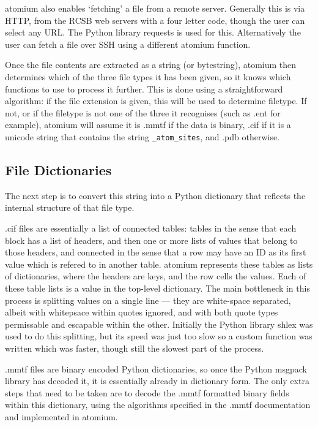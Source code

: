 atomium also enables `fetching' a file from a remote server. Generally this is via HTTP, from the RCSB web servers \cite{burley2020pdb} with a four letter code, though the user can select any URL. The Python library requests \cite{requests} is used for this. Alternatively the user can fetch a file over SSH using a different atomium function.

Once the file contents are extracted as a string (or bytestring), atomium then determines which of the three file types it has been given, so it knows which functions to use to process it further. This is done using a straightforward algorithm: if the file extension is given, this will be used to determine filetype. If not, or if the filetype is not one of the three it recognises (such as .ent for example), atomium will assume it is .mmtf if the data is binary, .cif if it is a unicode string that contains the string \texttt{\_atom\_sites}, and .pdb otherwise.

\subsection{File Dictionaries}

The next step is to convert this string into a Python dictionary that reflects the internal structure of that file type.

.cif files are essentially a list of connected tables: tables in the sense that each block has a list of headers, and then one or more lists of values that belong to those headers, and connected in the sense that a row may have an ID as its first value which is refered to in another table. atomium represents these tables as lists of dictionaries, where the headers are keys, and the row cells the values. Each of these table lists is a value in the top-level dictionary. The main bottleneck in this process is splitting values on a single line --- they are white-space separated, albeit with whitepsace within quotes ignored, and with both quote types permissable and escapable within the other. Initially the Python library shlex was used to do this splitting, but its speed was just too slow so a custom function was written which was faster, though still the slowest part of the process.

.mmtf files are binary encoded Python dictionaries, so once the Python msgpack library has decoded it, it is essentially already in dictionary form. The only extra steps that need to be taken are to decode the .mmtf formatted binary fields within this dictionary, using the algorithms specified in the .mmtf documentation and implemented in atomium.

